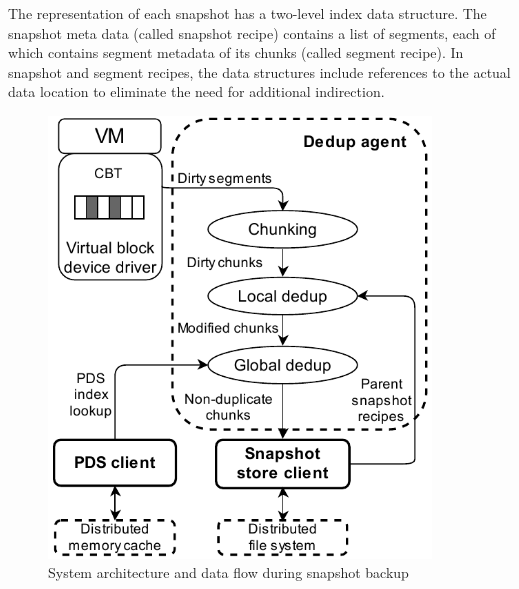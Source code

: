 The representation of each snapshot has  a two-level index data structure.
The snapshot meta data (called snapshot recipe) contains a list of segments, each of which contains segment
metadata of its chunks (called segment recipe).
In snapshot and segment recipes, 
the data structures  include references to the actual data location to eliminate the need for additional indirection.

\begin{figure}[htbp]
    \centering
    \includegraphics[width=4in]{images/socc_arch_cluster}
    \caption{System architecture and data flow during snapshot backup}
    \label{fig:arch_vm}
\end{figure}

